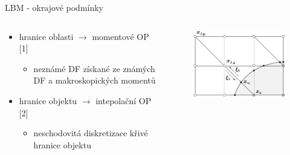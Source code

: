 \documentclass[aspectratio=169,xcolor=dvipsnames]{beamer}
\begin{document}
\begin{frame}{LBM - okrajové podmínky}
	\begin{columns}[T] %
		\begin{column}{.55\textwidth}
			\begin{itemize}
				\item hranice oblasti $ \rightarrow $ momentové OP [1]
				\begin{itemize}
					\vspace{1mm}
					\item neznámé DF získané ze známých DF a makroskopických momentů
					\vspace{1mm}
				\end{itemize}
				\item hranice objektu $ \rightarrow $ intepolační OP [2]
				\begin{itemize}
					\vspace{1mm}
					\item neschodovitá diskretizace křivé hranice objektu
					\vspace{1mm}
				\end{itemize}
			\end{itemize}
		\end{column}%
		\begin{column}{.45\textwidth}
			\begin{figure}
				\vspace{-0.5cm}
				\includegraphics[width=0.78\linewidth, trim={0 0 0 0}, clip]{Images/bouzidi.pdf}
			\end{figure}
		\end{column}%
	\end{columns}
	\vspace{4.5mm}
	\begin{columns}
		\begin{column}{.63\textwidth}

\end{column}
\end{columns}
\end{frame}
\end{document}

